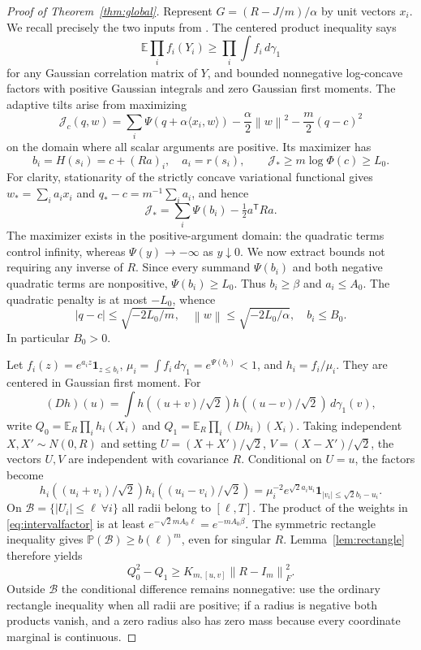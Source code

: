 \documentclass[11pt]{article}
\theoremstyle{remark}\newtheorem{remark}[theorem]{Remark}
\newcommand{\E}{\mathbb E}
\newcommand{\Pp}{\mathbb P}
\newcommand{\norm}[1]{\left\lVert#1\right\rVert}
\begin{document}
\begin{proof}[Proof of Theorem~\ref{thm:global}]
Represent $G=(R-J/m)/\alpha$ by unit vectors $x_i$. We recall precisely the
two inputs from \cite{Mulgund}. The centered product inequality says
\begin{equation}\label{eq:product}
 \E\prod_i f_i(Y_i)\ge\prod_i\int f_i\,d\gamma_1
\end{equation}
for any Gaussian correlation matrix of $Y$, and bounded nonnegative
log-concave factors with positive Gaussian integrals and zero Gaussian first
moments. The adaptive tilts arise from maximizing
\[
 \mathcal J_c(q,w)=\sum_i\Psi(q+\alpha\langle x_i,w\rangle)
             -\frac\alpha2\norm w^2-\frac m2(q-c)^2
\]
on the domain where all scalar arguments are positive. Its maximizer has
\begin{equation}\label{eq:tilt}
b_i=H(s_i)=c+(Ra)_i,\quad a_i=r(s_i),\qquad
 \mathcal J_*\ge m\log\Phi(c)\ge L_0.
\end{equation}
For clarity, stationarity of the strictly concave variational functional gives
$w_*=\sum_i a_i x_i$ and $q_*-c=m^{-1}\sum_i a_i$, and hence
\[
 \mathcal J_*=\sum_i\Psi(b_i)-\tfrac12 a^{\mathsf T}Ra.
\]
The maximizer exists in the positive-argument domain: the quadratic terms
control infinity, whereas $\Psi(y)\to-\infty$ as $y\downarrow0$.
We now extract bounds not requiring any inverse of $R$.
Since every summand $\Psi(b_i)$ and both negative quadratic terms are
nonpositive, $\Psi(b_i)\ge L_0$. Thus $b_i\ge\beta$ and $a_i\le A_0$.
The quadratic penalty is at most $-L_0$, whence
\[
 |q-c|\le\sqrt{-2L_0/m},\quad
 \norm w\le\sqrt{-2L_0/\alpha},\quad b_i\le B_0.
\]
In particular $B_0>0$.

Let $f_i(z)=e^{a_i z}\mathbf1_{z\le b_i}$,
$\mu_i=\int f_i\,d\gamma_1=e^{\Psi(b_i)}<1$, and $h_i=f_i/\mu_i$.
They are centered in Gaussian first moment. For
\[
 (Dh)(u)=\int h((u+v)/\sqrt2)h((u-v)/\sqrt2)\,d\gamma_1(v),
\]
write $Q_0=\E_R\prod_i h_i(X_i)$ and $Q_1=\E_R\prod_i(Dh_i)(X_i)$.
Taking independent $X,X'\sim N(0,R)$ and setting
$U=(X+X')/\sqrt2$, $V=(X-X')/\sqrt2$, the vectors $U,V$ are independent
with covariance $R$. Conditional on $U=u$, the factors become
\begin{equation}\label{eq:intervalfactor}
 h_i((u_i+v_i)/\sqrt2)h_i((u_i-v_i)/\sqrt2)
 =\mu_i^{-2}e^{\sqrt2 a_i u_i}
   \mathbf1_{|v_i|\le\sqrt2 b_i-u_i}.
\end{equation}
On $\mathcal B=\{|U_i|\le\ell\ \forall i\}$ all radii belong to $[\ell,T]$.
The product of the weights in \eqref{eq:intervalfactor} is at least
$e^{-\sqrt2 mA_0\ell}=e^{-mA_0\beta}$. The symmetric rectangle inequality
gives $\Pp(\mathcal B)\ge b(\ell)^m$, even for singular $R$.
Lemma~\ref{lem:rectangle} therefore yields
\begin{equation}\label{eq:selfgap}
 Q_0^2-Q_1\ge K_{m,[u,v]}\norm{R-I_m}_F^2.
\end{equation}
Outside $\mathcal B$ the conditional difference remains nonnegative:
use the ordinary rectangle inequality when all radii are positive; if a
radius is negative both products vanish, and a zero radius also has zero
mass because every coordinate marginal is continuous.


\end{proof}
\end{document}

